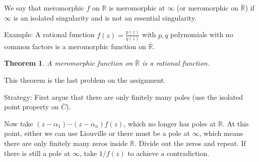 \documentclass{artikel3}
\newcommand{\complex}{\mathbb{R}}
\newtheorem{thm}{Theorem}
\numberwithin{equation}{enumi}
\begin{document}
We say that meromorphic $f$ on $\complex$ is meromorphic at $\infty$
(or meromorphic on $\bar{\complex}$) if $\infty$ is an isolated
singularity and is not an essential singularity.

Example: A rational function $f(z)=\frac{p(z)}{q(z)}$ with
$p,q$ polynomials with no common factors is a meromorphic
function on $\bar{\complex}$.

\begin{thm}
	A meromorphic function on $\bar{\complex}$ is a rational function.
\end{thm}
This theorem is the last problem on the assignment.

Strategy:
First argue that there are only finitely many poles (use the isolated
point property on $\bar{C}$).

Now take $(z-\alpha_1)\cdots (z-\alpha_n)f(z)$, which no longer
has poles at $\complex$.  At this point, either we can use Liouville
or there must be a pole
at $\infty$, which means there are only finitely many zeros inside
$\complex$.  Divide out the zeros and repeat.  If there is still a pole at
$\infty$, take $1/f(z)$ to achieve a contradiction.
\label{lastpage}
\end{document}

